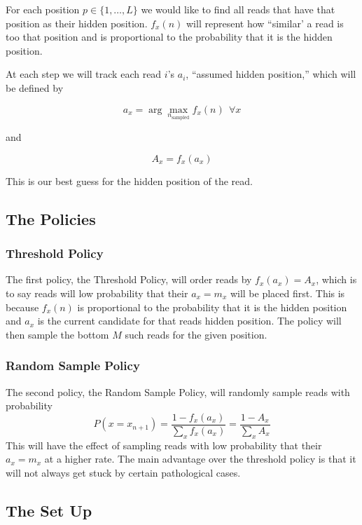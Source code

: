 \documentclass[phd,tocprelim]{cornell}
\begin{document}
For each position $p \in \{1, \ldots, L\}$ we would like to find all reads that have that position as their hidden position. $f_{x}(n)$ will represent how ``similar' a read is too that position and is proportional to the probability that it is the hidden position.

At each step we will track each read $i$'s $a_{i}$,  ``assumed hidden position,'' which will be defined by

\[a_{x} = \arg\max_{n_{\mbox{sampled}}} f_{x}(n) \ \ \forall x\]

and

\[A_{x} = f_{x}(a_{x})\]

This is our best guess for the hidden position of the read.

\subsection{The Policies}

\subsubsection{Threshold Policy}

The first policy, the Threshold Policy, will order reads by $f_{x}(a_{x}) = A_{x}$, which is to say reads will low probability that their $a_{x} = m_{x}$ will be placed first. This is because $f_{x}(n)$ is proportional to the probability that it is the hidden position and $a_{x}$ is the current candidate for that reads hidden position. The policy will then sample the bottom $M$ such reads for the given position.

\subsubsection{Random Sample Policy}

The second policy, the Random Sample Policy, will randomly sample reads with probability
\[P(x = x_{n+1}) = \frac{1 - f_{x}(a_{x})}{\sum_{x} f_{x}(a_{x})} = \frac{1 - A_{x}}{\sum_{x} A_{x}}\]
This will have the effect of sampling reads with low probability that their $a_{x} = m_{x}$ at a higher rate. The main advantage over the threshold policy is that it will not always get stuck by certain pathological cases.

\subsection{The Set Up}
\end{document}
